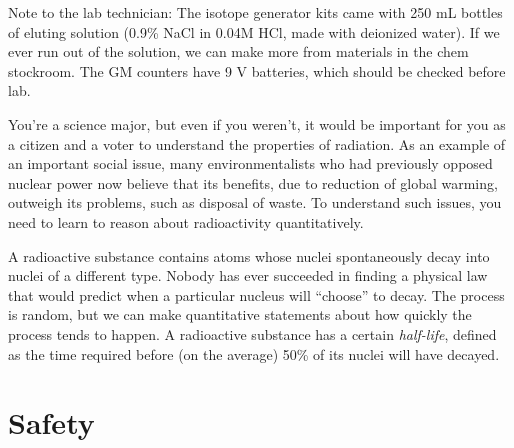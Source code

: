\label{lab:radioactivity}

Note to the lab technician: The isotope generator kits came with 250 mL bottles
of eluting solution (0.9\% NaCl in 0.04M HCl, made with deionized water). If we
ever run out of the solution, we can make more from materials in the chem
stockroom.  The GM counters have 9 V batteries, which should be checked before
lab.

\apparatus
{}


\introduction

You're a science major, but even if you weren't, it would be
important for you as a citizen and a voter to understand
the properties of radiation. As an example of an important social
issue, many environmentalists
who had previously opposed nuclear power now believe that its
benefits, due to reduction of global warming, outweigh its
problems, such as disposal of waste. To understand such
issues, you need to learn to reason about radioactivity
quantitatively.

A radioactive substance contains atoms whose nuclei spontaneously
decay into nuclei of a different type. Nobody has ever succeeded
in finding a physical law that would predict when a particular
nucleus will ``choose'' to decay. The process is random, but we
can make quantitative statements about how quickly the process tends
to happen.
A radioactive substance has a certain \emph{half-life}, defined
as the time required before (on the average) 50\%
of its nuclei will have decayed.


\section*{Safety}

